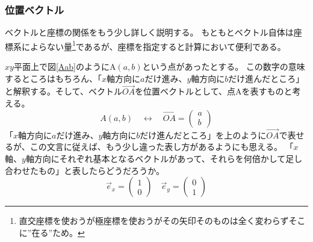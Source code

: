 \documentclass[10pt]{jsarticle}
\newcommand{\vc}[1]{\overrightarrow{#1}}%
\numberwithin{equation}{section}%
\begin{document}
\subsubsection{位置ベクトル}
ベクトルと座標の関係をもう少し詳しく説明する。
もともとベクトル自体は座標系によらない量\footnote{直交座標を使おうが極座標を使おうがその矢印そのものは全く変わらずそこに''在る''ため。}であるが、座標を指定すると計算において便利である。


$xy$平面上で図\ref{Aab}のようにA$(a,b)$という点があったとする。
この数字の意味するところはもちろん、「$x$軸方向に$a$だけ進み、$y$軸方向に$b$だけ進んだところ」と解釈する。そして、ベクトル$\vc{OA}$を位置ベクトルとして、点Aを表すものと考える。
\begin{equation}
  A(a,b)\quad\leftrightarrow\quad \vc{OA}=\left(\begin{matrix}
    a\\
    b
  \end{matrix}\right)
\end{equation}
「$x$軸方向に$a$だけ進み、$y$軸方向に$b$だけ進んだところ」を上のように$\vc{OA}$で表せるが、この文言に従えば、もう少し違った表し方があるようにも思える。
「$x$軸、$y$軸方向にそれぞれ基本となるベクトルがあって、それらを何倍かして足し合わせたもの」と表したらどうだろうか。
\begin{equation}
  \vec{e}_{x}=\left(\begin{matrix}
    1\\
    0
  \end{matrix}\right)\quad \vec{e}_{y}=\left(\begin{matrix}
    0\\
    1
  \end{matrix}\right)
\end{equation}
\end{document}
